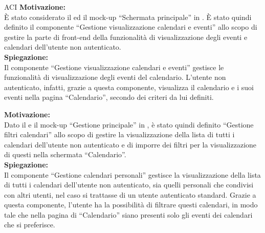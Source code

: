 \begin{listaPersonale}{ACI}
    \textbf{Motivazione:}\\
    È stato considerato il  ed il mock-up  “Schermata principale” in .
    È stato quindi definito il componente “Gestione visualizzazione calendari e eventi” allo scopo di gestire la parte di front-end della funzionalità di visualizzazione degli eventi e calendari dell'utente non autenticato.\\
    \textbf{Spiegazione:}\\
    Il componente “Gestione visualizzazione calendari e eventi” gestisce le funzionalità di visualizzazione degli eventi del calendario. L'utente non autenticato, infatti, grazie a questa componente, visualizza il calendario e i suoi eventi nella pagina “Calendario”, secondo dei criteri da lui definiti.



    \textbf{Motivazione:}\\
    Dato il  e il mock-up “Gestione principale” in , è stato quindi definito “Gestione filtri calendari” allo scopo di gestire la visualizzazione della lista di tutti i calendari dell'utente non autenticato e di imporre dei filtri per la visualizzazione di questi nella schermata “Calendario”.\\
    \textbf{Spiegazione:}\\
    Il componente “Gestione calendari personali” gestisce la visualizzazione della lista di tutti i calendari dell'utente non autenticato, sia quelli personali che condivisi con altri utenti, nel caso si trattasse di un utente autenticato standard. Grazie a questa componente, l'utente ha la possibilità di filtrare questi calendari, in modo tale che nella pagina di “Calendario” siano presenti solo gli eventi dei calendari che si preferisce.




\end{listaPersonale}
